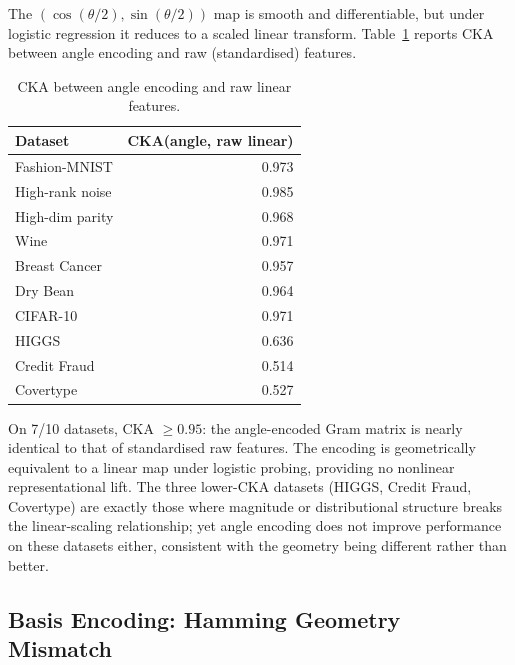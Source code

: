 The $(\cos(\theta/2), \sin(\theta/2))$ map is smooth and differentiable, but
under logistic regression it reduces to a scaled linear transform.
Table~\ref{tab:cka_angle} reports CKA between angle encoding and raw
(standardised) features.

\begin{table}[tbp]
\centering
\caption{CKA between angle encoding and raw linear features.}
\label{tab:cka_angle}
\small
\begin{tabular}{lr}
\toprule
Dataset & CKA(angle, raw linear) \\
\midrule
Fashion-MNIST   & 0.973 \\
High-rank noise & 0.985 \\
High-dim parity & 0.968 \\
Wine            & 0.971 \\
Breast Cancer   & 0.957 \\
Dry Bean        & 0.964 \\
CIFAR-10        & 0.971 \\
HIGGS           & 0.636 \\
Credit Fraud    & 0.514 \\
Covertype       & 0.527 \\
\bottomrule
\end{tabular}
\end{table}

On 7/10 datasets, CKA $\geq 0.95$: the angle-encoded Gram matrix is nearly
identical to that of standardised raw features.
The encoding is geometrically equivalent to a linear map under logistic
probing, providing no nonlinear representational lift.
The three lower-CKA datasets (HIGGS, Credit Fraud, Covertype) are exactly
those where magnitude or distributional structure breaks the
linear-scaling relationship; yet angle encoding does not improve performance
on these datasets either, consistent with the geometry being different rather
than better.

\subsection{Basis Encoding: Hamming Geometry Mismatch}
\label{sec:basis}

